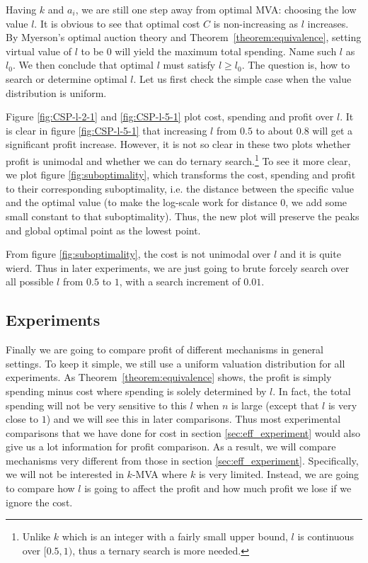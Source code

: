 Having $k$ and $a_i$, we are still one step away from optimal MVA: choosing the low
value $l$. It is obvious to see that optimal cost $C$ is non-increasing as $l$
increases. By Myerson's optimal auction theory and Theorem~\ref{theorem:equivalence}, setting virtual value of $l$ to be $0$ will yield
the maximum total spending. Name such $l$ as $l_0$. We then conclude that
optimal $l$ must satisfy $l \geq l_0$. The
question is, how to search or determine optimal $l$. Let us first check the simple
case when the value distribution is uniform.

Figure \ref{fig:CSP-l-2-1} and \ref{fig:CSP-l-5-1} plot cost, spending and profit
over $l$. It is clear in figure \ref{fig:CSP-l-5-1} that increasing $l$ from $0.5$ to about $0.8$
will get a significant profit increase. However, it is not so clear in these two plots
whether profit is unimodal and whether we can do ternary search.\footnote{Unlike $k$ which is
an integer with a fairly small upper bound, $l$ is continuous over $[0.5, 1)$, 
thus a ternary search is more needed.}
To see it more clear, we plot figure \ref{fig:suboptimality},
which transforms the cost, spending and profit to their corresponding suboptimality, i.e.
the distance between the specific value and the optimal value (to make the log-scale work
for distance $0$, we add some small constant to that suboptimality). Thus, the new plot will
preserve the peaks and global optimal point as the lowest point.

From figure \ref{fig:suboptimality}, the cost is not unimodal over $l$ and it is quite wierd.
Thus in later experiments, we are just going to brute forcely search over all possible $l$ from $0.5$ to $1$,
with a search increment of $0.01$.

\subsection{Experiments}

Finally we are going to compare profit of different mechanisms in general settings.
To keep it simple, we still use a uniform valuation distribution for all
experiments.  As Theorem~\ref{theorem:equivalence} shows, the profit is simply
spending minus cost where spending is solely determined by $l$. In fact, the
total spending will not be very sensitive to this $l$ when $n$ is large (except
that $l$ is very close to $1$) and we will see this in later comparisons. Thus
most experimental comparisons that we have done for cost in section
\ref{sec:eff_experiment} would also give us a lot information for profit
comparison. As a result, we will compare mechanisms very different from those
in section \ref{sec:eff_experiment}. Specifically, we will not be interested in
$k$-MVA where $k$ is very limited. Instead, we are going to compare how $l$
is going to affect the profit and how much profit we lose if we ignore the cost.

